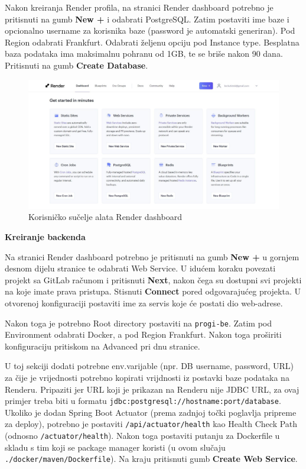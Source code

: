 Nakon kreiranja Render profila, na stranici Render dashboard potrebno je pritisnuti na gumb \textbf{New +} i odabrati PostgreSQL. Zatim postaviti ime baze i opcionalno username za korisnika baze (password je automatski generiran). Pod Region odabrati Frankfurt. Odabrati željenu opciju pod Instance type. Besplatna baza podataka ima maksimalnu pohranu od 1GB, te se briše nakon 90 dana. Pritisnuti na gumb \textbf{Create Database}.
			\begin{figure}[H]
			\includegraphics[width=\textwidth]{slike/render.PNG} %
			\caption{Korisničko sučelje alata Render dashboard}
			\label{fig:Render} %
			\end{figure}

		\noindent \textbf{Kreiranje backenda}

Na stranici Render dashboard potrebno je pritisnuti na gumb \textbf{New +} u gornjem desnom dijelu stranice te odabrati Web Service. U idućem koraku povezati projekt sa GitLab računom i pritisnuti \textbf{Next}, nakon čega su dostupni svi projekti na koje imate prava pristupa. Stisnuti \textbf{Connect} pored odgovarajućeg projekta. U otvorenoj konfiguraciji postaviti ime za servis koje će postati dio web-adrese.\par
Nakon toga je potrebno Root directory postaviti na \texttt{progi-be}. Zatim pod Environment odabrati Docker, a pod Region Frankfurt. Nakon toga proširiti konfiguraciju pritiskom na Advanced pri dnu stranice. \par
U toj sekciji dodati potrebne env.varijable (npr. DB username, password, URL) za čije je vrijednosti potrebno kopirati vrijdnosti iz postavki baze podataka na Renderu. Pripaziti jer URL koji je prikazan na Renderu nije JDBC URL, za ovaj primjer treba biti u formatu \texttt{jdbc:postgresql:\allowbreak//hostname:port\allowbreak/database}. Ukoliko je dodan Spring Boot Actuator (prema zadnjoj točki poglavlja pripreme za deploy), potrebno je postaviti \texttt{/api/actuator/health} kao Health Check Path (odnosno \texttt{/actuator/health}). Nakon toga postaviti putanju za Dockerfile u skladu s tim koji se package manager koristi (u ovom slučaju \texttt{./docker/maven/\allowbreak Dockerfile}). Na kraju pritisnuti gumb \textbf{Create Web Service}. \hfill \break

